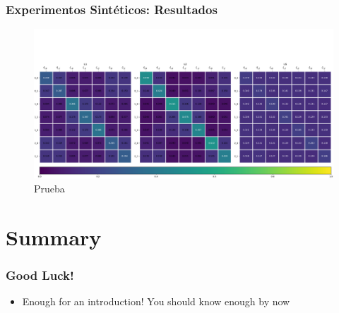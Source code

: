 \documentclass[aspectratio=43]{beamer}
\begin{document}
\begin{frame}
      \frametitle{Experimentos Sintéticos: Resultados}
      
      \centering
      \begin{figure}
            \includegraphics[width=.85\textwidth]{Chapter6/IGPL2022/adjMatrix_all__clasClusters_0.pdf}
            \caption{Prueba}
      \end{figure}

\end{frame}


\section{Summary}

\begin{frame}
\frametitle{Good Luck!}
\begin{itemize}
\item Enough for an introduction! You should know enough by now
\end{itemize}
\end{frame}

\backmatter
\end{document}

